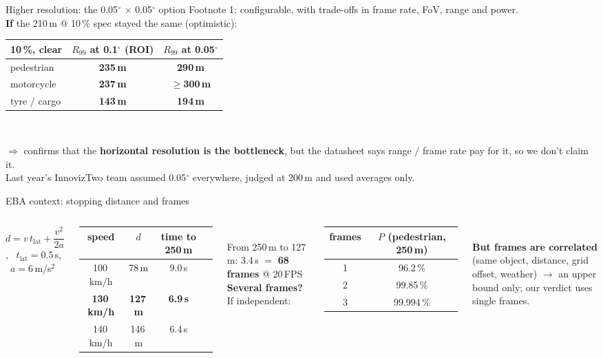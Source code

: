 \documentclass[aspectratio=169,11pt]{beamer}
\newcommand{\fail}[1]{\textcolor{red!70!black}{\textbf{#1}}}
\newcommand{\pass}[1]{\textcolor{green!45!black}{\textbf{#1}}}
\begin{document}
\begin{frame}{Higher resolution: the 0.05$^\circ$ $\times$ 0.05$^\circ$ option}
  \small
  Footnote 1: configurable, with trade-offs in frame rate, FoV, range and power.\\[0.5em]
  \textbf{If} the 210\,m @ 10\,\% spec stayed the same (optimistic):\\[0.3em]
  \centering
  \begin{tabular}{lcc}
    \toprule
    10\,\%, clear & $R_{99}$ at 0.1$^\circ$ (ROI) & $R_{99}$ at 0.05$^\circ$ \\
    \midrule
    pedestrian & \fail{235\,m} & \pass{290\,m} \\
    motorcycle & \fail{237\,m} & \pass{$\ge$300\,m} \\
    tyre / cargo & \fail{143\,m} & \fail{194\,m} \\
    \bottomrule
  \end{tabular}\\[1em]
  \raggedright
  $\Rightarrow$ confirms that the \textbf{horizontal resolution is the bottleneck}, but the
  datasheet says range / frame rate pay for it, so we don't claim it.\\[0.5em]
  \scriptsize Last year's InnovizTwo team assumed 0.05$^\circ$ everywhere, judged at 200\,m and used averages only.
\end{frame}

\begin{frame}{EBA context: stopping distance and frames}
  \small
  \begin{columns}[t]
    $d = v\,t_{\text{lat}} + \dfrac{v^2}{2a}$, \ $t_{\text{lat}} = 0.5$\,s, \ $a = 6$\,m/s$^2$\\[0.5em]
    \begin{tabular}{cccc}
      \toprule
      speed & $d$ & time to 250\,m \\
      \midrule
      100\,km/h & 78\,m & 9.0\,s \\
      \textbf{130\,km/h} & \textbf{127\,m} & \textbf{6.9\,s} \\
      140\,km/h & 146\,m & 6.4\,s \\
      \bottomrule
    \end{tabular}\\[0.5em]
    From 250\,m to 127\,m: 3.4\,s $=$ \textbf{68 frames} @ 20\,FPS
    \textbf{Several frames?} If independent:\\[0.3em]
    \begin{tabular}{cc}
      \toprule
      frames & $P$ (pedestrian, 250\,m) \\
      \midrule
      1 & 96.2\,\% \\
      2 & 99.85\,\% \\
      3 & 99.994\,\% \\
      \bottomrule
    \end{tabular}\\[0.5em]
    \fail{But frames are correlated} (same object, distance, grid offset, weather) $\rightarrow$
    an upper bound only; our verdict uses single frames.
  \end{columns}
\end{frame}
\end{document}

